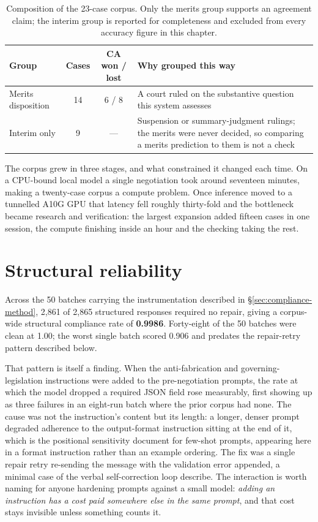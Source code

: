 \begin{table}[htbp]
\centering
\footnotesize
\caption[Corpus composition]{Composition of the 23-case corpus. Only the merits
group supports an agreement claim; the interim group is reported for completeness
and excluded from every accuracy figure in this chapter.}
\label{tab:corpus-summary}
\begin{tabular}{|l|c|c|p{5.6cm}|}
\hline
\textbf{Group} & \textbf{Cases} & \textbf{CA won / lost} & \textbf{Why grouped this way} \\
\hline
Merits disposition & 14 & 6 / 8 &
 A court ruled on the substantive question this system assesses \\
\hline
Interim only & 9 & --- &
 Suspension or summary-judgment rulings; the merits were never decided, so
 comparing a merits prediction to them is not a check \\
\hline
\end{tabular}
\end{table}

The corpus grew in three stages, and what constrained it changed each time. On a
CPU-bound local model a single negotiation took around seventeen minutes, making a
twenty-case corpus a compute problem. Once inference moved to a tunnelled A10G GPU
that latency fell roughly thirty-fold and the bottleneck became research and
verification: the largest expansion added fifteen cases in one session, the
compute finishing inside an hour and the checking taking the rest.

\section{Structural reliability}
\label{sec:structural}

Across the 50 batches carrying the instrumentation described in
\S\ref{sec:compliance-method}, 2{,}861 of 2{,}865
structured responses required no repair, giving a corpus-wide structural
compliance rate of \textbf{0.9986}. Forty-eight of the 50 batches were clean at
1.00; the worst single batch scored 0.906 and predates the repair-retry pattern
described below.

That pattern is itself a finding. When the anti-fabrication and
governing-legislation instructions were added to the pre-negotiation prompts, the
rate at which the model dropped a required JSON field rose measurably, first
showing up as three failures in an eight-run batch where the prior corpus had
none. The cause was not the instruction's content but its length: a longer,
denser prompt degraded adherence to the output-format instruction sitting at the
end of it, which is the positional sensitivity \citet{lu2022fantastically}
document for few-shot prompts, appearing here in a format instruction rather than
an example ordering. The fix was a single repair retry re-sending the message
with the validation error appended, a minimal case of the verbal self-correction
loop \citet{shinn2023reflexion} describe. The interaction is worth naming for
anyone hardening prompts against a small model: \emph{adding an instruction has a
cost paid somewhere else in the same prompt}, and that cost stays invisible
unless something counts it.


